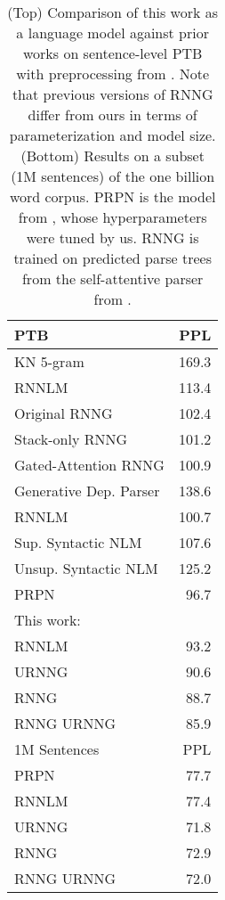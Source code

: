 \documentclass[11pt,a4paper]{article}
\begin{document}
\begin{table}[t]
    \small
    \centering
    \begin{tabular}{ l r }
    \toprule
     PTB  & PPL \\
    \midrule
    KN 5-gram \cite{dyer2016rnng} & 169.3 \\
    RNNLM  \cite{dyer2016rnng} & 113.4 \\
    Original RNNG   \cite{dyer2016rnng} & 102.4 \\
    Stack-only RNNG   \cite{kuncoro2017rnng} & 101.2 \\
    Gated-Attention RNNG   \cite{kuncoro2017rnng} & 100.9 \\
    Generative Dep. Parser \cite{buys2015gen} & 138.6 \\
    RNNLM \cite{buys2018syntax} & 100.7 \\
    Sup. Syntactic NLM  \cite{buys2018syntax} & 107.6 \\
    Unsup. Syntactic NLM   \cite{buys2018syntax} & 125.2 \\
    PRPN \cite{shen2018nlm}  & 96.7 \\
    This work: \\
         \hspace{2mm} RNNLM  & 93.2 \\
          \hspace{2mm} URNNG & 90.6\\
         \hspace{2mm} RNNG &  88.7 \\
         \hspace{2mm}  RNNG  URNNG & 85.9 \\
        \midrule
     1M Sentences & PPL \\
    \midrule
        PRPN \cite{shen2018nlm}  & 77.7 \\
        RNNLM & 77.4 \\
        URNNG & 71.8 \\
        RNNG & 72.9 \\
        RNNG  URNNG & 72.0 \\
         \bottomrule
    \end{tabular}
        \vspace{-2mm}
    \caption{(Top) Comparison of this work as a language model against prior works on
    sentence-level PTB with preprocessing from \citet{dyer2016rnng}. Note that previous versions of RNNG differ from ours in terms of parameterization and model size. (Bottom) Results on a subset (1M sentences) of  the one billion word corpus.  PRPN is
    the model from \citet{shen2018nlm}, whose hyperparameters were tuned by us.  RNNG is trained on predicted parse trees from the self-attentive parser from \citet{kitaev2018parsing}.}
    \label{tab:lm}
\vspace{-2mm}
\end{table}
\vspace{-2mm}
\end{document}

